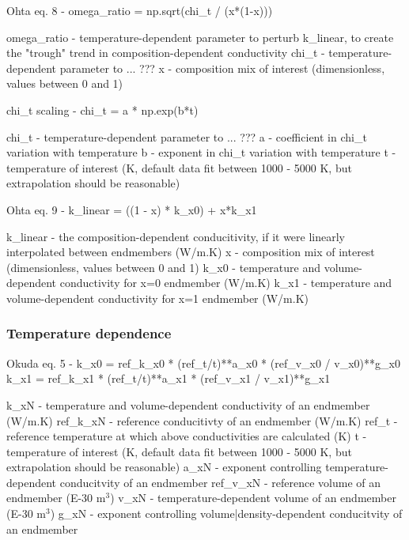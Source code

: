     Ohta eq. 8 - omega\_ratio = np.sqrt(chi\_t / (x*(1-x)))
                 
                 omega\_ratio - temperature-dependent parameter to perturb k\_linear,
                               to create the "trough" trend in composition-dependent conductivity
                 chi\_t       - temperature-dependent parameter to ... ???
                 x           - composition mix of interest (dimensionless, values between 0 and 1)


    chi\_t scaling - chi\_t = a * np.exp(b*t)

                    chi\_t - temperature-dependent parameter to ... ???
                    a     - coefficient in  chi\_t variation with temperature
                    b     - exponent in chi\_t variation with temperature
                    t     - temperature of interest (K, default data fit between 1000 - 5000 K,
                            but extrapolation should be reasonable)


    Ohta eq. 9 - k\_linear = ((1 - x) * k\_x0) + x*k\_x1 
                 
                 k\_linear - the composition-dependent conducitivity,
                            if it were linearly interpolated between endmembers (W/m.K)
                 x        - composition mix of interest (dimensionless, values between 0 and 1)
                 k\_x0     - temperature and volume-dependent conductivity for x=0 endmember (W/m.K)
                 k\_x1     - temperature and volume-dependent conductivity for x=1 endmember (W/m.K)

\subsubsection{Temperature dependence}
\cite{Okuda2017}

    Okuda eq. 5 - k\_x0 = ref\_k\_x0 * (ref\_t/t)**a\_x0 * (ref\_v\_x0 / v\_x0)**g\_x0
                           k\_x1 = ref\_k\_x1 * (ref\_t/t)**a\_x1 * (ref\_v\_x1 / v\_x1)**g\_x1
                  
                  k\_xN     - temperature and volume-dependent conductivity of an endmember (W/m.K)
                  ref\_k\_xN - reference conducitivty of an endmember (W/m.K)
                  ref\_t    - reference temperature at which above conductivities are calculated (K)
                  t        - temperature of interest (K, default data fit between 1000 - 5000 K,
                             but extrapolation should be reasonable)                  
                  a\_xN     - exponent controlling temperature-dependent conducitvity of an endmember
                  ref\_v\_xN - reference volume of an endmember (E-30 m$^3$)
                  v\_xN     - temperature-dependent volume of an endmember (E-30 m$^3$)
                  g\_xN     - exponent controlling volume|density-dependent conducitvity of an endmember


